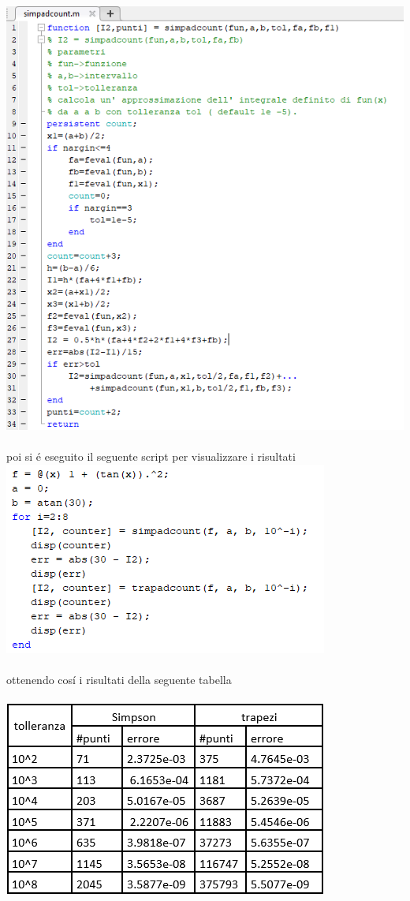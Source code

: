 \includegraphics[width=1.3\linewidth]{img/simpadcount}\\~\\
poi si \'e eseguito il seguente script per visualizzare i risultati\newline
\includegraphics[width=1\linewidth]{img/ex23}\\~\\
ottenendo cos\'i i risultati della seguente tabella\\~\\
\includegraphics[width=1.3\linewidth]{img/tabella23}
